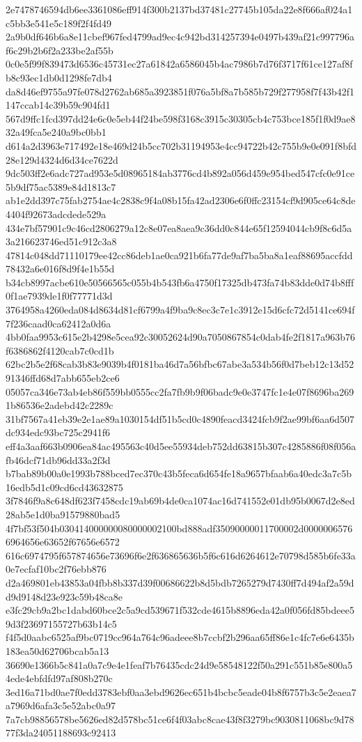 {2e7478746594db6ee3361086eff914f300b2137bd37481c27745b105da22e8f666af024a1c5bb3e541e5c189f2f4fd49
2a9b0df646b6a8e11cbef967fed4799ad9ec4c942bd314257394e0497b439af21c997796af6c29b2b6f2a233be2af55b
0c0e5f99f839473d6536c45731ec27a61842a6586045b4ac7986b7d76f3717f61ce127af8fb8c93ec1db0d1298fe7db4
da8d46ef9755a97fe078d2762ab685a3923851f076a5bf8a7b585b729f277958f7f43b42f1147ccab14c39b59c904fd1
567d9ffc1fcd397dd24e6c0e5eb44f24be598f3168c3915c30305cb4c753bce185f1f0d9ae832a49fca5e240a9bc0bb1
d614a2d3963e717492e18e469d24b5cc702b31194953e4cc94722b42c755b9e0e091f8bfd28e129d4324d6d34ce7622d
9dc503ff2e6adc727ad953e5d08965184ab3776cd4b892a056d459e954bed547cfc0e91ce5b9df75ac5389e84d1813c7
ab1e2dd397c75fab2754ae4c2838c9f4a08b15fa42ad2306e6f0ffc23154cf9d905ce64c8de4404f92673adcdede529a
434e7bf57901c9c46cd2806279a12c8e07ea8aea9c36dd0c844e65f12594044cb9f8c6d5a3a216623746ed51c912c3a8
47814c048dd71110179ee42cc86deb1ae0ca921b6fa77de9af7ba5ba8a1eaf88695accfdd78432a6e016f8d9f4e1b55d
b34cb8997acbe610e50566565c055b4b543fb6a4750f17325db473fa74b83dde0d74b8fff0f1ae7939de1f0f77771d3d
3764958a4260eda084d8634d81cf6799a4f9ba9c8ec3c7e1c3912e15d6cfc72d5141ce694f7f236caad0ca62412a0d6a
4bb0faa9953c615e2b4298e5cea92c30052624d90a7050867854c0dab4fe2f1817a963b76f6386862f4120cab7c0cd1b
62bc2b5e2f68cab3b83e9039b4f0181ba46d7a56bfbc67abe3a534b56f0d7beb12c13d5291346ffd68d7abb655eb2ce6
05057ca346e73ab4eb86f559bb0555cc2fa7fb9b9f06badc9e0e3747fc1e4e07f8696ba2691b86536e2adebd42c2289c
31bf7567a41eb39e2e1ae89a1030154df51b5cd0c4890feacd3424fcb9f2ae99bf6aa6d507dc934edc93bc725c2941f6
eff4a3aaf663b0906ea84ac495563c40d5ee55934deb752dd63815b307c4285886f08f056afb46dcf71db96dd33a2f3d
b7bab89b00a0e1993b788bced7ec370c43b5feca6d654fe18a9657bfaab6a40edc3a7c5b16edb5d1c09cd6cd43632875
3f7846f9a8c648df623f7458cdc19ab69b4de0ca1074ac16d741552e01db95b0067d2e8ed28ab5e1d0ba91579880bad5
4f7bf53f504b030414000000080000002100bd888adf35090000011700002d00000065766964656e63652f67656e6572
616c6974795f657874656e73696f6e2f636865636b5f6c616d6264612e70798d585b6fe33a0e7ecfaf10bc2f76ebb876
d2a469801eb43853a04fbb8b337d39f00686622b8d5bdb7265279d7430ff7d494af2a59dd9d9148d23e923c59b48ca8e
e3fc29cb9a2bc1dabd60bce2c5a9cd539671f532cde4615b8896eda42a0f056fd85bdeee59d3f23697155727b63b14c5
f4f5d0aabc6525af9bc0719cc964a764c96adeee8b7ccbf2b296aa65ff86e1c4fc7e6e6435b183ea50d62706bcab5a13
36690e1366b5c841a0a7c9e4e1feaf7b76435cdc24d9e58548122f50a291c551b85e800a54ede4ebfdfd97af808b270c
3ed16a71bd0ae7f0edd3783ebf0aa3ebd9626ec651b4bcbc5eade04b8f6757b3c5e2eaea7a7969d6afa3c5e52abc0a97
7a7cb98856578be5626ed82d578bc51ce6f4f03abc8cae43f8f3279bc9030811068bc9d7877f3da24051188693c92413
}
